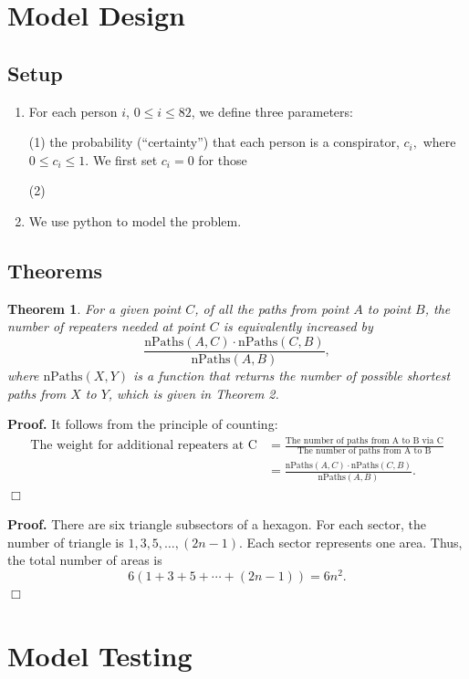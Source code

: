 \documentclass{icmmcm}
\newtheorem{Theo1}{Theorem}
\begin{document}
\section{Model Design}

\subsection{Setup}
\begin{enumerate}
\item For each person $i$, $0\leq i\leq 82$, we define three parameters: 

\quad (1) the probability (``certainty'')
that each person is a conspirator, $c_i,$
where $0\leq c_i \leq 1.$ 
We first set $c_i = 0$ for those

\quad (2) 

\item We use python to model the problem.
\end{enumerate}
\subsection{Theorems}
\begin{Theo1}
For a given point $C$, of all the paths from point $A$ to point $B$, the number of repeaters needed at point $C$ is equivalently increased by 
$$\frac{\text{nPaths}(A,C)\cdot \text{nPaths}(C,B)}{\text{nPaths}(A,B)},$$
where $\text{nPaths}(X,Y)$ is a function that returns the number of possible \emph{shortest} paths from $X$ to $Y$, which is given in Theorem 2.
\end{Theo1}
{\bf Proof.}
It follows from the principle of counting:
\begin{align*} \text{The weight for additional repeaters at C}
&=\frac{\text{The number of paths from A to B via C}}{\text{The number of paths from A to B}}\\
&=\frac{\text{nPaths}(A,C)\cdot \text{nPaths}(C,B)}{\text{nPaths}(A,B)}.
\end{align*}\hfill $\Box$

{\bf Proof.}
There are six triangle subsectors of a hexagon. For each sector, the number of triangle is $1, 3, 5, \ldots, (2n-1)$. Each sector represents one area. Thus, the total number of areas is
$$6(1+ 3+ 5+\cdots+ (2n-1))=6n^2.$$\hfill $\Box$

\section{Model Testing}
\end{document}
